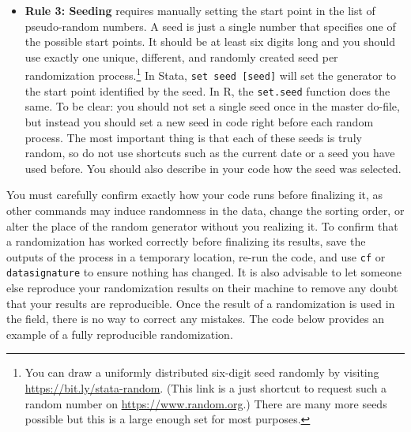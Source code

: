 \documentclass[
]{book}
\providecommand{\tightlist}{%
  \setlength{\itemsep}{0pt}\setlength{\parskip}{0pt}}
\begin{document}
\begin{itemize}
\tightlist
\item
  \textbf{Rule 3: Seeding} requires manually setting the start point in the list of pseudo-random numbers.
  A seed is just a single number that specifies one of the possible start points.
  It should be at least six digits long and you should use exactly
  one unique, different, and randomly created seed per randomization process.\footnote{You can draw a uniformly distributed six-digit seed randomly by visiting \url{https://bit.ly/stata-random}.
    (This link is a just shortcut to request such a random number on \url{https://www.random.org}.)
    There are many more seeds possible but this is a large enough set for most purposes.}
  In Stata, \texttt{set\ seed\ {[}seed{]}} will set the generator
  to the start point identified by the seed.
  In R, the \texttt{set.seed} function does the same.
  To be clear: you should not set a single seed once in the master do-file,
  but instead you should set a new seed in code right before each random process.
  The most important thing is that each of these seeds is truly random,
  so do not use shortcuts such as the current date or a seed you have used before.
  You should also describe in your code how the seed was selected.
\end{itemize}

You must carefully confirm exactly how your code runs before finalizing it,
as other commands may induce randomness in the data,
change the sorting order,
or alter the place of the random generator without you realizing it.
To confirm that a randomization has worked correctly before finalizing its results,
save the outputs of the process in a temporary location,
re-run the code, and use \texttt{cf} or \texttt{datasignature} to ensure
nothing has changed. It is also advisable to let someone else reproduce your
randomization results on their machine to remove any doubt that your results
are reproducible.
Once the result of a randomization is used in the field,
there is no way to correct any mistakes.
The code below provides an example of a fully reproducible randomization.
\end{document}
